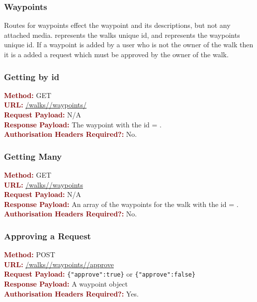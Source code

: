 \documentclass[11pt,a4paper]{report}
\begin{document}
\subsubsection{Waypoints}

Routes for waypoints effect the waypoint and its descriptions, but not any attached media.  represents the walks unique id, and  represents the waypoints unique id. If a waypoint is added by a user who is not the owner of the walk then it is a added a request which must be approved by the owner of the walk.

\subsubsection{Getting by id}
\textbf{\textcolor{Maroon}{Method:}} GET\\
\textbf{\textcolor{Maroon}{URL:}} \url{/walks/}\url{/waypoints/}\\
\textbf{\textcolor{Maroon}{Request Payload:}} N/A\\
\textbf{\textcolor{Maroon}{Response Payload:}} The waypoint with the id = .\\
\textbf{\textcolor{Maroon}{Authorisation Headers Required?:}} No.

\subsubsection{Getting Many}
\textbf{\textcolor{Maroon}{Method:}} GET\\
\textbf{\textcolor{Maroon}{URL:}} \url{/walks/}\url{/waypoints}\\
\textbf{\textcolor{Maroon}{Request Payload:}} N/A\\
\textbf{\textcolor{Maroon}{Response Payload:}} An array of the waypoints for the walk with the id = .\\
\textbf{\textcolor{Maroon}{Authorisation Headers Required?:}} No.

\subsubsection{Approving a Request}
\textbf{\textcolor{Maroon}{Method:}} POST\\
\textbf{\textcolor{Maroon}{URL:}} \url{/walks/}\url{/waypoints/}\url{/approve}\\
\textbf{\textcolor{Maroon}{Request Payload:}} \lstinline${"approve":true}$ or \lstinline${"approve":false}$\\
\textbf{\textcolor{Maroon}{Response Payload:}} A waypoint object\\
\textbf{\textcolor{Maroon}{Authorisation Headers Required?:}} Yes.
\end{document}
